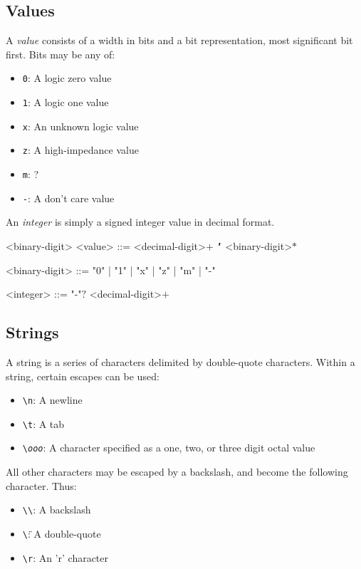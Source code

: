 \subsection{Values}

A \textit{value} consists of a width in bits and a bit representation, most significant bit first. Bits may be any of:
\begin{itemize}
    \item \texttt{0}: A logic zero value
    \item \texttt{1}: A logic one value
    \item \texttt{x}: An unknown logic value
    \item \texttt{z}: A high-impedance value
    \item \texttt{m}: ?
    \item \texttt{-}: A don't care value
\end{itemize}

An \textit{integer} is simply a signed integer value in decimal format.

\begin{indentgrammar}{<binary-digit>}
<value> ::= <decimal-digit>$+$ \texttt{\textbf{'}} <binary-digit>$*$

<binary-digit> ::= "0" | "1" | "x" | "z" | "m" | "-"

<integer> ::= "-"$?$ <decimal-digit>$+$
\end{indentgrammar}

\subsection{Strings}

A string is a series of characters delimited by double-quote characters. Within a string, certain escapes can be used:

\begin{itemize}
    \item \texttt{\textbackslash n}: A newline
    \item \texttt{\textbackslash t}: A tab
    \item \texttt{\textbackslash \textit{ooo}}: A character specified as a one, two, or three digit octal value
\end{itemize}

All other characters may be escaped by a backslash, and become the following character. Thus:

\begin{itemize}
    \item \texttt{\textbackslash \textbackslash}: A backslash
    \item \texttt{\textbackslash \"}: A double-quote
    \item \texttt{\textbackslash r}: An 'r' character
\end{itemize}


